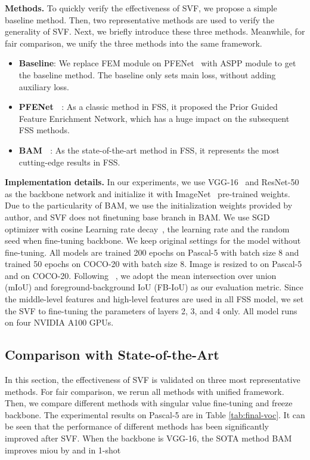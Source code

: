 \documentclass{article}
\begin{document}
\textbf{Methods.} To quickly verify the effectiveness of SVF, we propose a simple baseline method. Then, two representative methods are used to verify the generality of SVF. Next, we briefly introduce these three methods. Meanwhile, for fair comparison, we unify the three methods into the same framework.

\begin{itemize}[itemsep=2pt,topsep=0pt,parsep=0pt]
\item \textbf{Baseline}: We replace FEM module on PFENet~\cite{tian2020prior} with ASPP module to get the baseline method. The baseline only sets main loss, without adding auxiliary loss.
\item \textbf{PFENet ~\cite{tian2020prior}}: As a classic method in FSS, it proposed the Prior Guided Feature Enrichment Network, which has a huge impact on the subsequent FSS methods.
\item \textbf{BAM ~\cite{lang2022learning}}: As the state-of-the-art method in FSS, it represents the most cutting-edge results in FSS.
\end{itemize}






\textbf{Implementation details.} In our experiments, we use VGG-16~\cite{vgg} and ResNet-50~\cite{he2016deep} as the backbone network and initialize it with ImageNet~\cite{russakovsky2015imagenet} pre-trained weights. Due to the particularity of BAM, we use the initialization weights provided by author, and SVF does not finetuning base branch in BAM. We use SGD optimizer with cosine Learning rate decay~\cite{loshchilov2016sgdr}, the learning rate  and the random seed  when fine-tuning backbone. We keep original settings for the model without fine-tuning. All models are trained 200 epochs on Pascal-5 with batch size 8 and trained 50 epochs on COCO-20 with batch size 8. Image is resized to  on Pascal-5 and  on COCO-20. Following~\cite{liu2021few,xie2021few,yang2020prototype} , we adopt the mean intersection over union (mIoU) and foreground-background IoU (FB-IoU) as our evaluation metric. Since the middle-level features and 
high-level features are used in all FSS model, we set the SVF to fine-tuning the parameters of layers 2, 3, and 4 only. All model runs on four NVIDIA A100 GPUs.
\vspace{-.5em}

\subsection{Comparison with State-of-the-Art}
\vspace{-.5em}
In this section, the effectiveness of SVF is validated on three most representative methods. For fair comparison, we rerun all methods with unified framework. Then, we compare different methods with singular value fine-tuning and freeze backbone. The experimental results on Pascal-5 are in Table \ref{tab:final-voc}. It can be seen that the performance of different methods has been significantly improved after SVF. When the backbone is VGG-16, the SOTA method BAM improves miou by  and  in 1-shot \\
\end{document}
